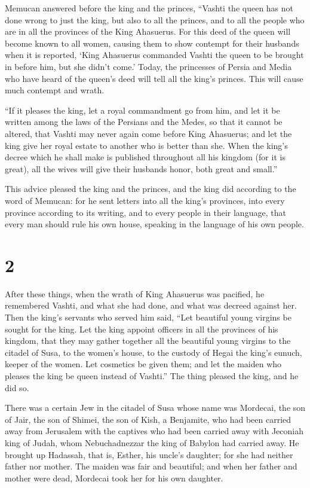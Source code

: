  Memucan answered before the king and the princes, ``Vashti
the queen has not done wrong to just the king, but also to all the
princes, and to all the people who are in all the provinces of the King
Ahasuerus.  For this deed of the queen will become known to
all women, causing them to show contempt for their husbands when it is
reported, `King Ahasuerus commanded Vashti the queen to be brought in
before him, but she didn't come.'  Today, the princesses of
Persia and Media who have heard of the queen's deed will tell all the
king's princes. This will cause much contempt and wrath.

 ``If it pleases the king, let a royal commandment go from
him, and let it be written among the laws of the Persians and the Medes,
so that it cannot be altered, that Vashti may never again come before
King Ahasuerus; and let the king give her royal estate to another who is
better than she.  When the king's decree which he shall
make is published throughout all his kingdom (for it is great), all the
wives will give their husbands honor, both great and small.''

 This advice pleased the king and the princes, and the king
did according to the word of Memucan:  for he sent letters
into all the king's provinces, into every province according to its
writing, and to every people in their language, that every man should
rule his own house, speaking in the language of his own people.

\hypertarget{section-1}{%
\section{2}\label{section-1}}

 After these things, when the wrath of King Ahasuerus was
pacified, he remembered Vashti, and what she had done, and what was
decreed against her.  Then the king's servants who served
him said, ``Let beautiful young virgins be sought for the king.
 Let the king appoint officers in all the provinces of his
kingdom, that they may gather together all the beautiful young virgins
to the citadel of Susa, to the women's house, to the custody of Hegai
the king's eunuch, keeper of the women. Let cosmetics be given them;
 and let the maiden who pleases the king be queen instead of
Vashti.'' The thing pleased the king, and he did so.

 There was a certain Jew in the citadel of Susa whose name
was Mordecai, the son of Jair, the son of Shimei, the son of Kish, a
Benjamite,  who had been carried away from Jerusalem with
the captives who had been carried away with Jeconiah king of Judah, whom
Nebuchadnezzar the king of Babylon had carried away.  He
brought up Hadassah, that is, Esther, his uncle's daughter; for she had
neither father nor mother. The maiden was fair and beautiful; and when
her father and mother were dead, Mordecai took her for his own daughter.


